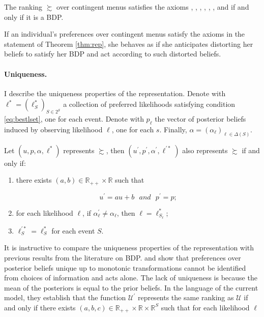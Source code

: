 \begin{theorem}\label{thm:rep}
	The ranking \( \succsim \) over contingent menus satisfies the axioms , , , , , ,  and  if and only if it is a BDP.
\end{theorem}

If an individual's preferences over contingent menus satisfy the axioms in the statement of Theorem \ref{thm:rep}, she behaves as if she anticipates distorting her beliefs to satisfy her BDP and act according to such distorted beliefs.

\paragraph{Uniqueness.} I describe the uniqueness properties of the representation. Denote with \( \ell^{*} = \left( \ell^{*}_{S} \right)_{S \in 2^\mathcal{S}} \) a collection of preferred likelihoods satisfying condition \eqref{eq:bestlset}, one for each event. Denote with \( p_{\ell} \) the vector of posterior beliefs induced by observing likelihood \( \ell \), one for each \( s\). Finally, \( \alpha = \left( \alpha_{\ell} \right)_{\ell \in \Delta \left( S \right)} \).

\begin{corollary}\label{cor:uniq}
	Let \( \left( u, p, \alpha, \ell^{*} \right) \) represents \( \succsim \), then \( \left( u^{\prime}, p^{\prime}, \alpha^{\prime}, \ell^{\prime *} \right) \) also represents \( \succsim \) if and only if:

	\begin{enumerate}
		\item there exists \( \left( a, b \right) \in \mathbb{R}_{++} \times \mathbb{R} \) such that

		      \[
			      u^{\prime} = a u + b \: \: \: and \: \: \: p^{\prime} = p ;
		      \]

		\item for each likelihood \( \ell \), if \( \alpha^{\prime}_{\ell} \neq \alpha_{\ell} \), then \( \ell = \ell^{*}_{S_{\ell}} \);
		\item \( \ell_{S}^{\prime *} = \ell_{S}^{*} \) for each event \( S \).
	\end{enumerate}
\end{corollary}

It is instructive to compare the uniqueness properties of the representation with previous results from the literature on BDP. \cite{eliazCanAnticipatoryFeelings2006} and \cite{liangInformationdependentExpectedUtility2017} show that preferences over posterior beliefs unique up to monotonic transformations cannot be identified from choices of information and acts alone. The lack of uniqueness is because the mean of the posteriors is equal to the prior beliefs. In the language of the current model, they establish that the function \( \mathcal{U}^{\prime} \) represents the same ranking as \( \mathcal{U} \) if and only if there exists \( \left( a, b, c \right) \in \mathbb{R}_{++} \times \mathbb{R} \times \mathbb{R}^{S} \) such that for each likelihood \( \ell \)


